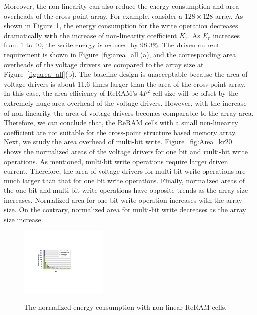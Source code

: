 Moreover, the non-linearity can also reduce the energy consumption and
area overheads of the cross-point array. For example, consider a $128
\times 128$ array. As shown in Figure~\ref{fig:non_linear_energy}, the
energy consumption for the write operation decreases dramatically with the
increase of non-linearity coefficient $K_r$. As $K_r$ increases from 1 to
40, the write energy is reduced by 98.3\%. The driven current requirement
is shown in Figure~\ref{fig:area_all}(a), and the corresponding area
overheads of the voltage drivers are compared to the array size at
Figure~\ref{fig:area_all}(b). The baseline design is unacceptable because
the area of voltage drivers is about 11.6 times larger than the area of
the cross-point array. In this case, the area efficiency of ReRAM's $4F^2$
cell size will be offset by the extremely huge area overhead of the
voltage drivers. However, with the increase of non-linearity, the area of
voltage drivers becomes comparable to the array area. Therefore, we can
conclude that, the ReRAM cells with a small non-linearity coefficient are
not suitable for the cross-point structure based memory array. Next, we
study the area overhead of multi-bit write. Figure~\ref{fig:Area_kr20}
shows the normalized areas of the voltage drivers for one bit and
multi-bit write operations. As mentioned, multi-bit write operations
require larger driven current. Therefore, the area of voltage drivers for
multi-bit write operations are much larger than that for one bit write
operations. Finally, normalized areas of the one bit and multi-bit write
operations have opposite trends as the array size increases. Normalized
area for one bit write operation increases with the array size. On the
contrary, normalized area for multi-bit write decreases as the array size
increase.

\begin{figure}%
\centering
  \includegraphics[width=0.38\textwidth]{./figures/non_linear_energy.pdf}\\
  \caption{The normalized energy consumption with non-linear ReRAM cells.}\label{fig:non_linear_energy}
\end{figure}

